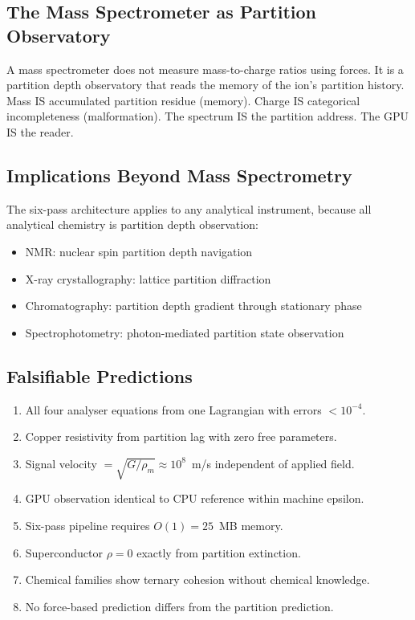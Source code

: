 \documentclass[11pt,twocolumn,a4paper]{article}
\theoremstyle{definition}
\theoremstyle{remark}
\begin{document}
\subsection{The Mass Spectrometer as Partition Observatory}

A mass spectrometer does not measure mass-to-charge ratios using forces. It is a partition depth observatory that reads the memory of the ion's partition history. Mass IS accumulated partition residue (memory). Charge IS categorical incompleteness (malformation). The spectrum IS the partition address. The GPU IS the reader.

\subsection{Implications Beyond Mass Spectrometry}

The six-pass architecture applies to any analytical instrument, because all analytical chemistry is partition depth observation:
\begin{itemize}[nosep]
\item NMR: nuclear spin partition depth navigation
\item X-ray crystallography: lattice partition diffraction
\item Chromatography: partition depth gradient through stationary phase
\item Spectrophotometry: photon-mediated partition state observation
\end{itemize}

\subsection{Falsifiable Predictions}

\begin{enumerate}[nosep]
\item All four analyser equations from one Lagrangian with errors $< 10^{-4}$.
\item Copper resistivity from partition lag with zero free parameters.
\item Signal velocity $= \sqrt{G/\rho_m} \approx 10^8$~m/s independent of applied field.
\item GPU observation identical to CPU reference within machine epsilon.
\item Six-pass pipeline requires $O(1) = 25$~MB memory.
\item Superconductor $\rho = 0$ exactly from partition extinction.
\item Chemical families show ternary cohesion without chemical knowledge.
\item No force-based prediction differs from the partition prediction.
\end{enumerate}
\end{document}
